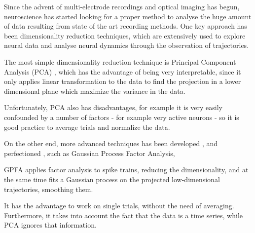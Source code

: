 Since the advent of multi-electrode recordings and optical imaging has begun, neuroscience has started looking for a proper method to analyse the huge amount of data resulting from state of the art recording methods.
One key approach has been dimensionality reduction techniques, which are extensively used to explore neural data and analyse neural dynamics through the observation of trajectories.

The most simple dimensionality reduction technique is Principal Component Analysis (PCA) , which has the advantage of being very interpretable, since it only applies linear transformation to the data to find the projection in a lower dimensional plane which maximize the variance in the data.

Unfortunately, PCA also has disadvantages, for example it is very easily confounded by a number of factors - for example very active neurons - so it is good practice to average trials and normalize the data.

On the other end, more advanced techniques has been developed \cite{byron2009gaussian}, and perfectioned \cite{luttinen2009variational}, such as Gaussian Process Factor Analysis, 

GPFA applies factor analysis to spike trains, reducing the dimensionality, and at the same time fits a Gaussian process on the projected low-dimensional trajectories, smoothing them.

It has the advantage to work on single trials, without the need of averaging. Furthermore, it takes into account the fact that the data is a time series, while PCA ignores that information.

